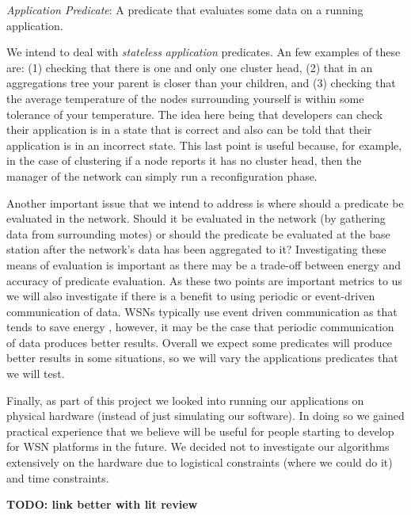 \begin{mydef}
\emph{Application Predicate}: A predicate that evaluates some data on a running application.
\end{mydef}

We intend to deal with \emph{stateless} \emph{application} predicates. An few examples of these are: (1) checking that there is one and only one cluster head, (2) that in an aggregations tree your parent is closer than your children, and (3) checking that the average temperature of the nodes surrounding yourself is within some tolerance of your temperature. The idea here being that developers can check their application is in a state that is correct and also can be told that their application is in an incorrect state. This last point is useful because, for example, in the case of clustering if a node reports it has no cluster head, then the manager of the network can simply run a reconfiguration phase.

Another important issue that we intend to address is where should a predicate be evaluated in the network. Should it be evaluated in the network (by gathering data from surrounding motes) or should the predicate be evaluated at the base station after the network's data has been aggregated to it? Investigating these means of evaluation is important as there may be a trade-off between energy and accuracy of predicate evaluation. As these two points are important metrics to us we will also investigate if there is a benefit to using periodic or event-driven communication of data. WSNs typically use event driven communication \cite{?} as that tends to save energy \cite{?}, however, it may be the case that periodic communication of data produces better results. Overall we expect some predicates will produce better results in some situations, so we will vary the applications predicates that we will test.

Finally, as part of this project we looked into running our applications on physical hardware (instead of just simulating our software). In doing so we gained practical experience that we believe will be useful for people starting to develop for WSN platforms in the future. We decided not to investigate our algorithms extensively on the hardware due to logistical constraints (where we could do it) and time constraints.

\textbf{TODO: link better with lit review}



